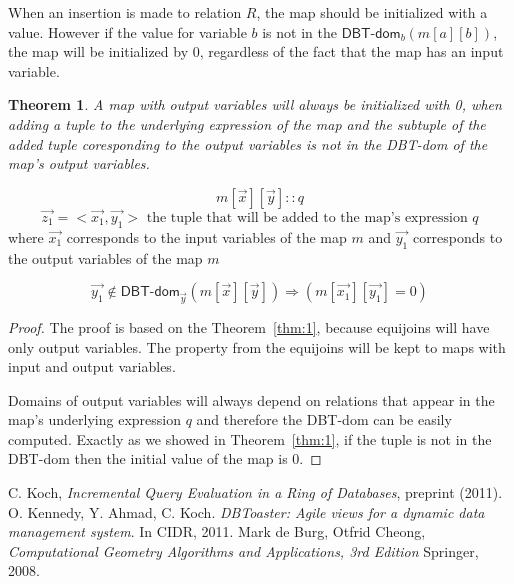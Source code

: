 \documentclass[12pt]{article}
\newtheorem{theorem}{Theorem}
\newcommand{\dom}{\textsf{DBT-dom}}
\begin{document}
When an insertion is made to relation $R$, the map should be initialized with a value. However if the value for variable $b$ is not in the  $\dom{}_{b}(m[a][b])$, the map will be initialized by 0, regardless of the fact that the map has an input variable.

\begin{theorem}
A map with output variables will always be initialized with 0, when adding a tuple to the underlying expression of the map and the subtuple of the added tuple coresponding to the output variables is not in the \dom{} of the map's output variables. 
\end{theorem}
$$m[\vec{x}][\vec{y}]::q$$
$$\vec{z_{1}}=<\vec{x_{1}},\vec{y_{1}}>\mbox{ the tuple that will be added to the map's expression } q$$
where $\vec{x_{1}}$ corresponds to the input variables of the map $m$ and $\vec{y_{1}}$ corresponds to the output variables of the map $m$

$$\vec{y_{1}}\notin\dom{}_{\vec{y}}(m[\vec{x}][\vec{y}])\Rightarrow (m[\vec{x_{1}}][\vec{y_{1}}]=0)$$

\begin{proof}
The proof is based on the Theorem~\ref{thm:1}, because equijoins will have only output variables. The property from the equijoins will be kept to maps with input and output variables.

Domains of output variables will always depend on relations that appear in the map's underlying expression $q$ and therefore the \dom{} can be easily computed. Exactly as we showed in Theorem~\ref{thm:1}, if the tuple is not in the \dom{} then the initial value of the map is 0.
\end{proof}

\begin{thebibliography}{9}
 C. Koch, \emph{Incremental Query Evaluation in a Ring of Databases},  preprint (2011).
 O. Kennedy, Y. Ahmad, C. Koch. \emph{DBToaster: Agile views for a dynamic data management system}. In CIDR, 2011.
 Mark de Burg, Otfrid Cheong, \emph{Computational Geometry Algorithms and Applications, 3rd Edition} Springer, 2008.
\end{thebibliography}
\end{document}
